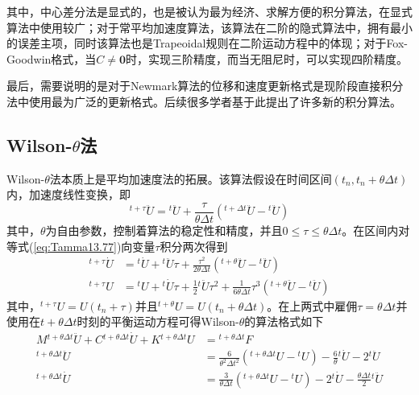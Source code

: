 其中，中心差分法是显式的，也是被认为最为经济、求解方便的积分算法，在显式算法中使用较广；对于常平均加速度算法，该算法在二阶的隐式算法中，拥有最小的误差主项\cite{Dahlquist1963}，同时该算法也是Trapeoidal规则在二阶运动方程中的体现；对于Fox-Goodwin格式，当$C\neq\mathbf{0}$时，实现三阶精度，而当无阻尼时，可以实现四阶精度。

最后，需要说明的是对于Newmark算法的位移和速度更新格式是现阶段直接积分法中使用最为广泛的更新格式。后续很多学者基于此提出了许多新的积分算法\cite{Hilber1978,Hilber1977,Wood1980a,KaiPing2008}。
 
\subsection{Wilson-$\theta$法}

Wilson-$\theta$法\cite{Wilson1968}本质上是平均加速度法的拓展。该算法假设在时间区间$(t_n,t_{n}+\theta\Delta t)$内，加速度线性变换，即
\begin{equation}
{^{t+\tau}\!\ddot{U}}={^t\!\ddot{U}}+\frac{\tau}{\theta\Delta t}({^{t+\Delta t}\!\ddot{U}}-{^t\!\ddot{U}})\label{eq:Tamma13.77}
\end{equation}
其中，$\theta$为自由参数，控制着算法的稳定性和精度，并且$0\le\tau\le\theta\Delta t$。在区间内对等式(\ref{eq:Tamma13.77})向变量$\tau$积分两次得到
\begin{subequations}
\begin{align}
{^{t+\tau}\!\dot{U}}&={^t\!\dot{U}}+{^t\!\ddot{U}}\tau+\frac{\tau^2}{2\theta\Delta t}({^{t+\theta}\!\ddot{U}}-{^t\!\ddot{U}})\\
{^{t+\tau}\!U}&={^t\!U}+{^t\!\dot{U}}\tau+\frac{1}{2}{^t\!\ddot{U}}\tau^2+\frac{1}{6\theta\Delta t}\tau^3({^{t+\theta}\!\ddot{U}}-{^t\!\ddot{U}})
\end{align}\label{eq:Tamma13.79}
\end{subequations}
其中，${^{t+\tau}\!U}=U(t_n+\tau)$并且${^{t+\theta}\!U}=U(t_n+\theta\Delta t)$。在上两式中雇佣$\tau=\theta\Delta t$并使用在$t+\theta\Delta t$时刻的平衡运动方程可得Wilson-$\theta$的算法格式如下
\begin{subequations}
\begin{align}
M{^{t+\theta\Delta t}\!\ddot{U}}+C{^{t+\theta\Delta t}\!\dot{U}}+K{^{t+\theta\Delta t}\!U}&={^{t+\theta\Delta t}\!F}\\
{^{t+\theta\Delta t}\!\ddot{U}}&=\frac{6}{\theta^2\Delta t^2}({^{t+\theta\Delta t}\!U}-{^t\!U})-\frac{6}{\theta}{^t\!\dot{U}}-2{^t\!\ddot{U}}\\
{^{t+\theta\Delta t}\!\dot{U}}&=\frac{3}{\theta\Delta t}({^{t+\theta\Delta t}\!U}-{^t\!U})-2{^t\!\dot{U}}-\frac{\theta\Delta t}{2}{^t\!\ddot{U}}
\end{align}\label{ee:Tammma13.80}
\end{subequations}
